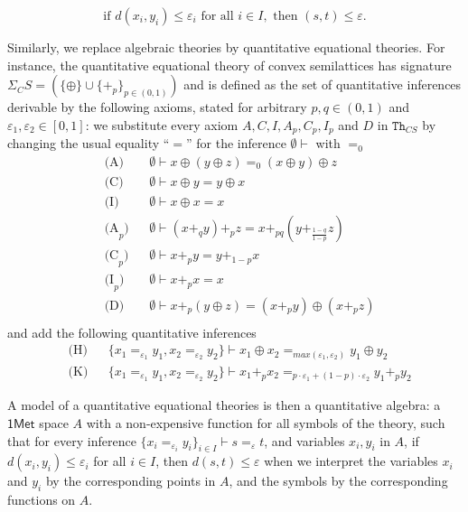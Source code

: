 \documentclass{article}
\newcommand{\cat}[1]{\mathsf{#1}}
\newcommand{\Th}{\mathtt{Th}}
\begin{document}
\[ \text{if } d(x_i, y_i) \leq \varepsilon_i \text{ for all } i \in I, \text{ then } (s, t) \leq \varepsilon.\]

Similarly, we replace algebraic theories by quantitative equational theories.
 For instance, the quantitative equational theory of convex semilattices has signature $\Sigma_CS = (\{\oplus\}\cup\{+_p\}_{p\in(0,1)})$ and is defined as the set of quantitative inferences derivable by the following axioms, stated for arbitrary $p, q \in (0, 1)$ and $\varepsilon_1, \varepsilon_2 \in [0, 1]$:
    we substitute every axiom $A,C,I,A_p,C_p,I_p$ and $D$ in \(\Th_{CS}\) by changing the usual equality ``$=$'' for the inference $ \emptyset \vdash $ with $=_0$
    \[\begin{aligned}
&\text{(A)} && \emptyset \vdash x \oplus (y \oplus z) =_{0} (x \oplus y) \oplus z \\
&\text{(C)} && \emptyset \vdash x \oplus y = y \oplus x \\
&\text{(I)} && \emptyset \vdash x \oplus x = x \\
&\text{(A}_p) && \emptyset \vdash (x +_q y) +_p z = x +_{pq} (y +_{\frac{1-q}{1-p}} z) \\
&\text{(C}_p) && \emptyset \vdash x +_p y = y +_{1-p} x \\
&\text{(I}_p) && \emptyset \vdash x +_p x = x \\
&\text{(D)} && \emptyset \vdash x +_p (y \oplus z) = (x +_p y) \oplus (x +_p z) \\
\end{aligned}\]
    and add the following quantitative inferences
    \[\begin{aligned}
&\text{(H)} && \{x_1 =_{\varepsilon_1} y_1, x_2 =_{\varepsilon_2} y_2\} \vdash x_1 \oplus x_2 =_{max(\varepsilon_1,\varepsilon_2)} y_1 \oplus y_2 \\
&\text{(K)} && \{x_1 =_{\varepsilon_1} y_1, x_2 =_{\varepsilon_2} y_2\} \vdash x_1 +_p x_2 =_{p \cdot \varepsilon_1 + (1-p) \cdot \varepsilon_2} y_1 +_p y_2 
\end{aligned}\]

A model of a quantitative equational theories is then a quantitative algebra: a $\cat{1Met}$ space $A$ with a non-expensive function for all symbols of the theory, such that for every inference $\{x_i =_{\varepsilon_i} y_i\}_{i\in I} \vdash s =_{\varepsilon} t$, and variables $x_i, y_i$ in $A$, if $d(x_i, y_i) \leq \varepsilon_i$ for all $i \in I$, then $d(s,t)\leq \varepsilon$ when we interpret the variables $x_i$ and $y_i$ by the corresponding points in $A$, and the symbols by the corresponding functions on $A$.
\end{document}
